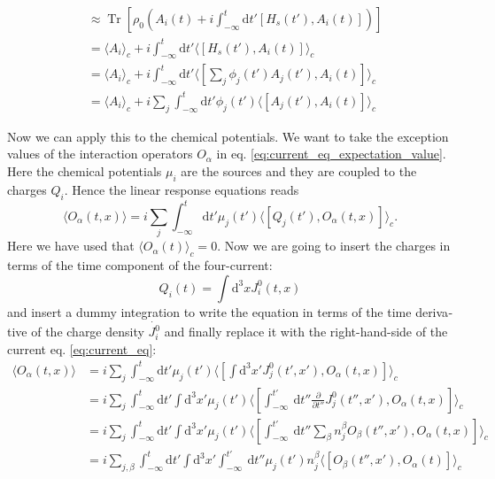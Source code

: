 \documentclass[master,       %
               twoside,        %
               BCOR10mm,       %
               english,ngerman, %
               ]{GAUBM}
\begin{document}
\begin{otherlanguage}{english}
\begin{align}
    &\approx \operatorname{Tr} \left[ \rho_0 (A_i(t) + i \int_{-\infty}^t \mathrm{d} t' [H_s(t'), A_i(t)] ) \right] \nonumber \\
    &= \langle A_i \rangle_c + i \int_{-\infty}^t \mathrm{d} t' \langle [H_s(t'), A_i(t)] \rangle_c \nonumber \\
    &= \langle A_i \rangle_c + i \int_{-\infty}^t \mathrm{d} t' \langle [\sum_j \phi_j(t') A_j(t'), A_i(t)] \rangle_c  \nonumber \\
    &= \langle A_i \rangle_c + i \sum_j \int_{-\infty}^t \mathrm{d} t' \phi_j(t') \langle [A_j(t'), A_i(t)] \rangle_c
\end{align}

Now we can apply this to the chemical potentials.
We want to take the exception values of the interaction operators $O_\alpha$ in eq. \eqref{eq:current_eq_expectation_value}.
Here the chemical potentials $\mu_i$ are the sources and they are coupled to the charges $Q_i$.
Hence the linear response equations reads
\begin{equation}
	\langle O_\alpha(t, x) \rangle = i \sum_j \int_{-\infty}^t \mathrm{d} t' \mu_j(t') \langle [Q_j(t'), O_\alpha(t, x)] \rangle_c.
\end{equation}
Here we have used that $\langle O_\alpha(t) \rangle_c = 0$.
Now we are going to insert the charges in terms of the time component of the four-current:
\begin{equation}
	Q_i(t) = \int \mathrm{d}^3 x J^0_i(t, x)
\end{equation}
and insert a dummy integration to write the equation in terms of the time derivative of the charge density $\dot{J^0_i}$ and finally replace it with the right-hand-side of the current eq. \eqref{eq:current_eq}:
\begin{align}
	\langle O_\alpha(t, x) \rangle &= i \sum_j \int_{-\infty}^t \mathrm{d} t' \mu_j(t') \langle [\int \mathrm{d}^3 x' J^0_j(t', x'), O_\alpha(t, x)] \rangle_c \nonumber \\
	&= i \sum_j \int_{-\infty}^t \mathrm{d} t' \int \mathrm{d}^3 x'  \mu_j(t') \langle [\int^{t'}_{-\infty} \ \mathrm{d} t'' \frac{\partial}{\partial t''} J^0_j(t'', x'), O_\alpha(t, x)] \rangle_c \nonumber \\
	&= i \sum_j \int_{-\infty}^t \mathrm{d} t' \int \mathrm{d}^3 x'  \mu_j(t') \langle [\int^{t'}_{-\infty} \ \mathrm{d} t'' \sum_\beta n^\beta_j O_\beta(t'', x'), O_\alpha(t, x)] \rangle_c \nonumber \\
	&= i \sum_{j, \beta} \int_{-\infty}^t \mathrm{d} t' \int \mathrm{d}^3 x' \int^{t'}_{-\infty} \ \mathrm{d} t'' \mu_j(t') n^\beta_j \langle [ O_\beta(t'', x'), O_\alpha(t)] \rangle_c

\end{align}
\end{otherlanguage}
\end{document}
